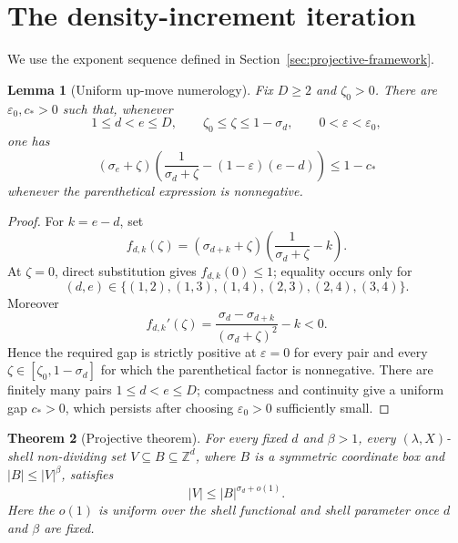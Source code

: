 \documentclass[11pt,reqno]{amsart}
\newtheorem{theorem}{Theorem}[section]
\newtheorem{lemma}[theorem]{Lemma}
\theoremstyle{definition}
\theoremstyle{remark}
\newcommand{\Z}{\mathbb Z}
\newcommand{\eps}{\varepsilon}
\begin{document}
\section{The density-increment iteration}
\label{sec:iteration}

We use the exponent sequence defined in
Section~\ref{sec:projective-framework}.

\begin{lemma}[Uniform up-move numerology]
\label{lem:numerology}
Fix $D\ge2$ and $\zeta_0>0$.  There are $\eps_0,c_*>0$ such that, whenever
\[
 1\le d<e\le D,
 \qquad
 \zeta_0\le\zeta\le1-\sigma_d,
 \qquad
 0<\eps<\eps_0,
\]
one has
\[
 (\sigma_e+\zeta)
 \left(\frac1{\sigma_d+\zeta}-(1-\eps)(e-d)\right)
 \le1-c_*
\]
whenever the parenthetical expression is nonnegative.
\end{lemma}

\begin{proof}
For $k=e-d$, set
\[
 f_{d,k}(\zeta)
 =(\sigma_{d+k}+\zeta)
  \left(\frac1{\sigma_d+\zeta}-k\right).
\]
At $\zeta=0$, direct substitution gives $f_{d,k}(0)\le1$; equality occurs
only for
\[
 (d,e)\in\{(1,2),(1,3),(1,4),(2,3),(2,4),(3,4)\}.
\]
Moreover
\[
 f_{d,k}'(\zeta)
 =\frac{\sigma_d-\sigma_{d+k}}{(\sigma_d+\zeta)^2}-k<0.
\]
Hence the required gap is strictly positive at $\eps=0$ for every pair and
every $\zeta\in[\zeta_0,1-\sigma_d]$ for which the parenthetical factor is
nonnegative.  There are finitely many pairs $1\le d<e\le D$; compactness and
continuity give a uniform gap $c_*>0$, which persists after choosing
$\eps_0>0$ sufficiently small.
\end{proof}

\begin{theorem}[Projective theorem]
\label{thm:projective-main}
For every fixed $d$ and $\beta>1$, every $(\lambda,X)$-shell
non-dividing set $V\subseteq B\subseteq\Z^d$, where $B$ is a symmetric
coordinate box and $|B|\le|V|^\beta$, satisfies
\[
 |V|\le |B|^{\sigma_d+o(1)}.
\]
Here the $o(1)$ is uniform over the shell functional and shell parameter once
$d$ and $\beta$ are fixed.
\end{theorem}
\end{document}
